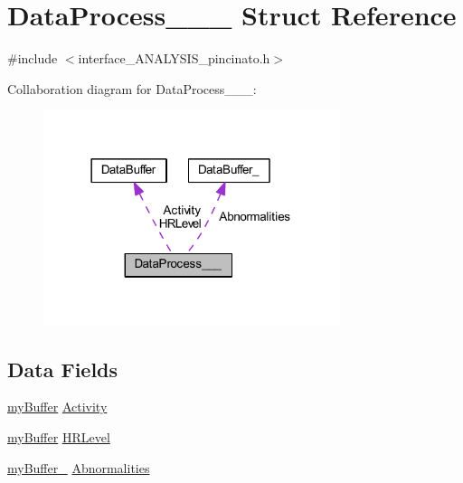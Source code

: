 \hypertarget{struct_data_process______}{}\section{Data\+Process\+\_\+\+\_\+\+\_\+ Struct Reference}
\label{struct_data_process______}


{\ttfamily \#include $<$interface\+\_\+\+A\+N\+A\+L\+Y\+S\+I\+S\+\_\+pincinato.\+h$>$}



Collaboration diagram for Data\+Process\+\_\+\+\_\+\+\_\+\+:\nopagebreak
\begin{figure}[H]
\begin{center}
\leavevmode
\includegraphics[width=246pt]{struct_data_process________coll__graph}
\end{center}
\end{figure}
\subsection*{Data Fields}
\begin{DoxyCompactItemize}
\item 
\mbox{\hyperlink{interface___a_n_a_l_y_s_i_s__pincinato_8h_a3184f2c2dc500ffc383f0a5e8e7f21f0}{my\+Buffer}} \mbox{\hyperlink{struct_data_process_______a696c2caf522a9390d98922952a57670f}{Activity}}
\item 
\mbox{\hyperlink{interface___a_n_a_l_y_s_i_s__pincinato_8h_a3184f2c2dc500ffc383f0a5e8e7f21f0}{my\+Buffer}} \mbox{\hyperlink{struct_data_process_______af6130eb725e93603b2960dec4d4378ff}{H\+R\+Level}}
\item 
\mbox{\hyperlink{interface___a_n_a_l_y_s_i_s__pincinato_8h_a02b20b214e8ea5dba5c4b81cd4638fc1}{my\+Buffer\+\_\+}} \mbox{\hyperlink{struct_data_process_______a9d2c0e8b260cec8c51618e7991a2c787}{Abnormalities}}
\end{DoxyCompactItemize}


